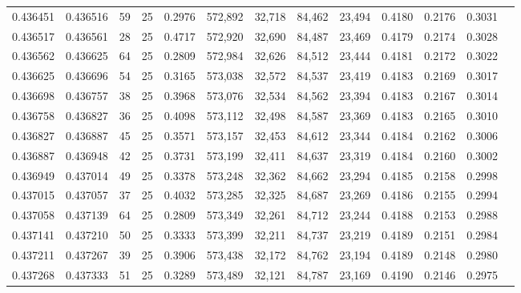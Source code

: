 \begin{tabular}{rrrrrrrrrrrrr}
0.436451 & 0.436516 &    59 &  25 &                                     0.2976 & 572,892 &  32,718 &  84,462 &  23,494 & 0.4180 & 0.2176 & 0.3031 \\
0.436517 & 0.436561 &    28 &  25 &                                     0.4717 & 572,920 &  32,690 &  84,487 &  23,469 & 0.4179 & 0.2174 & 0.3028 \\
0.436562 & 0.436625 &    64 &  25 &                                     0.2809 & 572,984 &  32,626 &  84,512 &  23,444 & 0.4181 & 0.2172 & 0.3022 \\
0.436625 & 0.436696 &    54 &  25 &                                     0.3165 & 573,038 &  32,572 &  84,537 &  23,419 & 0.4183 & 0.2169 & 0.3017 \\
0.436698 & 0.436757 &    38 &  25 &                                     0.3968 & 573,076 &  32,534 &  84,562 &  23,394 & 0.4183 & 0.2167 & 0.3014 \\
0.436758 & 0.436827 &    36 &  25 &                                     0.4098 & 573,112 &  32,498 &  84,587 &  23,369 & 0.4183 & 0.2165 & 0.3010 \\
0.436827 & 0.436887 &    45 &  25 &                                     0.3571 & 573,157 &  32,453 &  84,612 &  23,344 & 0.4184 & 0.2162 & 0.3006 \\
0.436887 & 0.436948 &    42 &  25 &                                     0.3731 & 573,199 &  32,411 &  84,637 &  23,319 & 0.4184 & 0.2160 & 0.3002 \\
0.436949 & 0.437014 &    49 &  25 &                                     0.3378 & 573,248 &  32,362 &  84,662 &  23,294 & 0.4185 & 0.2158 & 0.2998 \\
0.437015 & 0.437057 &    37 &  25 &                                     0.4032 & 573,285 &  32,325 &  84,687 &  23,269 & 0.4186 & 0.2155 & 0.2994 \\
0.437058 & 0.437139 &    64 &  25 &                                     0.2809 & 573,349 &  32,261 &  84,712 &  23,244 & 0.4188 & 0.2153 & 0.2988 \\
0.437141 & 0.437210 &    50 &  25 &                                     0.3333 & 573,399 &  32,211 &  84,737 &  23,219 & 0.4189 & 0.2151 & 0.2984 \\
0.437211 & 0.437267 &    39 &  25 &                                     0.3906 & 573,438 &  32,172 &  84,762 &  23,194 & 0.4189 & 0.2148 & 0.2980 \\
0.437268 & 0.437333 &    51 &  25 &                                     0.3289 & 573,489 &  32,121 &  84,787 &  23,169 & 0.4190 & 0.2146 & 0.2975 \\

\end{tabular}
